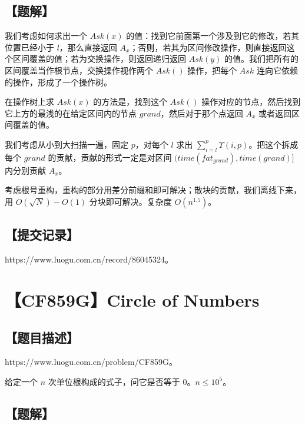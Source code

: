 \documentclass[UTF8,12pt,a4paper]{ctexart}
\begin{document}
	\subsection*{【题解】}
	
	我们考虑如何求出一个 $Ask(x)$ 的值：找到它前面第一个涉及到它的修改，若其位置已经小于 $l$，那么直接返回 $A_x$；否则，若其为区间修改操作，则直接返回这个区间覆盖的值；若为交换操作，则返回递归返回 $Ask(y)$ 的值。我们把所有的区间覆盖当作根节点，交换操作视作两个 $Ask()$ 操作，把每个 $Ask$ 连向它依赖的操作，形成了一个操作树。
	
	在操作树上求 $Ask(x)$ 的方法是，找到这个 $Ask()$ 操作对应的节点，然后找到它上方的最浅的在给定区间内的节点 $grand$，然后对于那个点返回 $A_x$ 或者返回区间覆盖的值。
	
	我们考虑从小到大扫描一遍，固定 $p$，对每个 $l$ 求出 $\sum_{i=l}^p \Upsilon(i,p)$。把这个拆成每个 $grand$ 的贡献，贡献的形式一定是对区间 $(time\left(fat_{grand}\right),time(grand)]$ 内分别贡献 $A_x$。
	
	考虑根号重构，重构的部分用差分前缀和即可解决；散块的贡献，我们离线下来，用 $O(\sqrt{N}) - O(1)$ 分块即可解决。复杂度 $O\left(n^{1.5}\right)$。
	
	\subsection*{【提交记录】}
	
	https://www.luogu.com.cn/record/86045324。
	
	
	\section*{【CF859G】Circle of Numbers}
	
	\subsection*{【题目描述】}
	
	https://www.luogu.com.cn/problem/CF859G。
	
	给定一个 $n$ 次单位根构成的式子，问它是否等于 $0$。$n\le 10^5$。
	
	\subsection*{【题解】}
	
\end{document}
